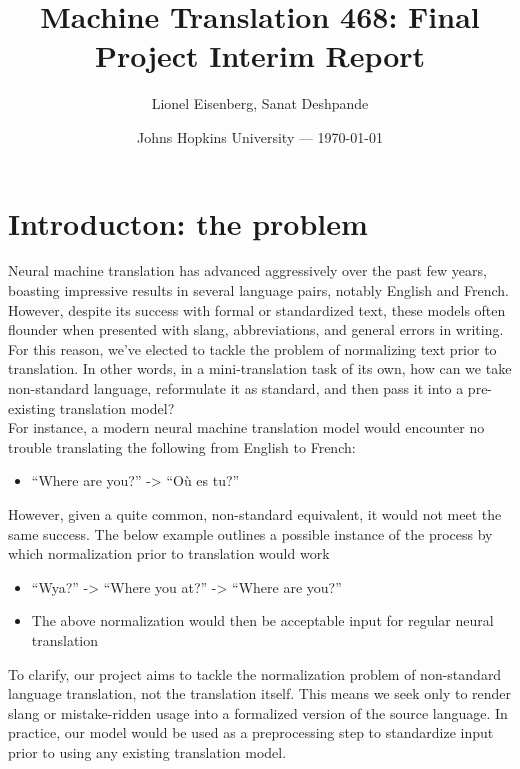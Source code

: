 \documentclass{article}
\title{Machine Translation 468: Final Project Interim Report} %
\author{ Lionel Eisenberg, Sanat Deshpande} %
\date{Johns Hopkins University --- \today} %
\begin{document}
\maketitle %


\section{Introducton: the problem} %
  
Neural machine translation has advanced aggressively over the past few years, boasting impressive results in several language pairs, notably English and French. However, despite its success with formal or standardized text, these models often flounder when presented with slang, abbreviations, and general errors in writing. For this reason, we’ve elected to tackle the problem of normalizing text prior to translation. In other words, in a mini-translation task of its own, how can we take non-standard language, reformulate it as standard, and then pass it into a pre-existing translation model? \\

For instance, a modern neural machine translation model would encounter no trouble translating the following from English to French:

\begin{itemize}
	\item “Where are you?” -> “Où es tu?”
\end{itemize}
However, given a quite common, non-standard equivalent, it would not meet the same success. The below example outlines a possible instance of the process by which normalization prior to translation would work
\begin{itemize}
	\item “Wya?” -> “Where you at?” -> “Where are you?”
	\item The above normalization would then be acceptable input for regular neural translation
\end{itemize}

To clarify, our project aims to tackle the normalization problem of non-standard language translation, not the translation itself. This means we seek only to render slang or mistake-ridden usage into a formalized version of the source language. In practice, our model would be used as a preprocessing step to standardize input prior to using any existing translation model.\\
\end{document}
